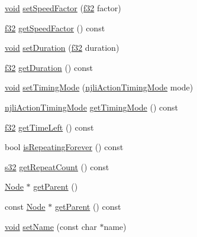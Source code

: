 \begin{DoxyCompactItemize}
\item 
\mbox{\hyperlink{_thread_8h_af1e856da2e658414cb2456cb6f7ebc66}{void}} \mbox{\hyperlink{classnjli_1_1_action_a3aeafe981e3b127eb9ad728e88e31315}{set\+Speed\+Factor}} (\mbox{\hyperlink{_util_8h_a5f6906312a689f27d70e9d086649d3fd}{f32}} factor)
\item 
\mbox{\hyperlink{_util_8h_a5f6906312a689f27d70e9d086649d3fd}{f32}} \mbox{\hyperlink{classnjli_1_1_action_acccdab60df21ef125bc43e2d914203e8}{get\+Speed\+Factor}} () const
\item 
\mbox{\hyperlink{_thread_8h_af1e856da2e658414cb2456cb6f7ebc66}{void}} \mbox{\hyperlink{classnjli_1_1_action_a036937b57eea213ffeb977e3c22e51f6}{set\+Duration}} (\mbox{\hyperlink{_util_8h_a5f6906312a689f27d70e9d086649d3fd}{f32}} duration)
\item 
\mbox{\hyperlink{_util_8h_a5f6906312a689f27d70e9d086649d3fd}{f32}} \mbox{\hyperlink{classnjli_1_1_action_a3473d3b336d30b21976a8aa14f105b50}{get\+Duration}} () const
\item 
\mbox{\hyperlink{_thread_8h_af1e856da2e658414cb2456cb6f7ebc66}{void}} \mbox{\hyperlink{classnjli_1_1_action_a134104e9db058f54d9724eea552a16fd}{set\+Timing\+Mode}} (\mbox{\hyperlink{namespacenjli_affc383078a5935be1509062828a1824b}{njli\+Action\+Timing\+Mode}} mode)
\item 
\mbox{\hyperlink{namespacenjli_affc383078a5935be1509062828a1824b}{njli\+Action\+Timing\+Mode}} \mbox{\hyperlink{classnjli_1_1_action_ab0c079cfbeb80643e147ea7899e32a50}{get\+Timing\+Mode}} () const
\item 
\mbox{\hyperlink{_util_8h_a5f6906312a689f27d70e9d086649d3fd}{f32}} \mbox{\hyperlink{classnjli_1_1_action_a62fdaf50d4555346103e8f4fd388ed38}{get\+Time\+Left}} () const
\item 
bool \mbox{\hyperlink{classnjli_1_1_action_af53c39e134a055c410ccccdf94943ff0}{is\+Repeating\+Forever}} () const
\item 
\mbox{\hyperlink{_util_8h_aa62c75d314a0d1f37f79c4b73b2292e2}{s32}} \mbox{\hyperlink{classnjli_1_1_action_a1f46ddf3b7469fc24cc50ce184ee1926}{get\+Repeat\+Count}} () const
\item 
\mbox{\hyperlink{classnjli_1_1_node}{Node}} $\ast$ \mbox{\hyperlink{classnjli_1_1_action_a53e72e1dd95f30c07e97ad59a721669c}{get\+Parent}} ()
\item 
const \mbox{\hyperlink{classnjli_1_1_node}{Node}} $\ast$ \mbox{\hyperlink{classnjli_1_1_action_af12f2df2adb1048d1fbe625f9be44122}{get\+Parent}} () const
\item 
\mbox{\hyperlink{_thread_8h_af1e856da2e658414cb2456cb6f7ebc66}{void}} \mbox{\hyperlink{classnjli_1_1_action_a087eb5f8d9f51cc476f12f1d10a3cb95}{set\+Name}} (const char $\ast$name)

\end{DoxyCompactItemize}
